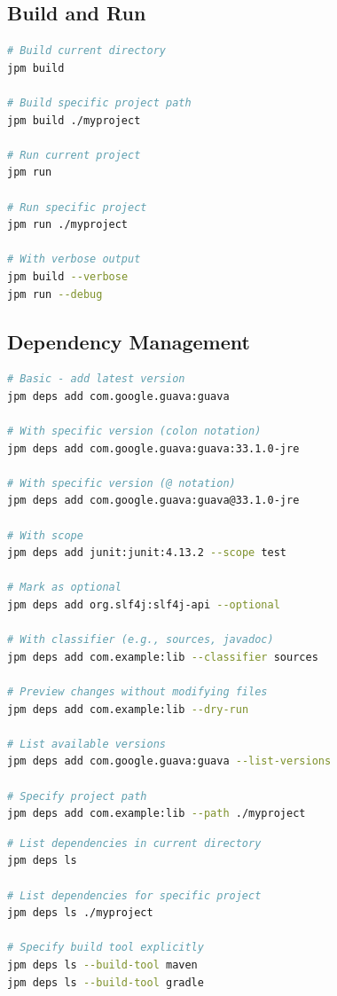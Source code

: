 \documentclass[12pt,a4paper]{report}
\begin{document}
\subsection{Build and Run}

\begin{lstlisting}[language=bash, caption=jpm build and jpm run]
# Build current directory
jpm build

# Build specific project path
jpm build ./myproject

# Run current project
jpm run

# Run specific project
jpm run ./myproject

# With verbose output
jpm build --verbose
jpm run --debug
\end{lstlisting}

\subsection{Dependency Management}

\begin{lstlisting}[language=bash, caption=jpm deps add - Add dependencies]
# Basic - add latest version
jpm deps add com.google.guava:guava

# With specific version (colon notation)
jpm deps add com.google.guava:guava:33.1.0-jre

# With specific version (@ notation)
jpm deps add com.google.guava:guava@33.1.0-jre

# With scope
jpm deps add junit:junit:4.13.2 --scope test

# Mark as optional
jpm deps add org.slf4j:slf4j-api --optional

# With classifier (e.g., sources, javadoc)
jpm deps add com.example:lib --classifier sources

# Preview changes without modifying files
jpm deps add com.example:lib --dry-run

# List available versions
jpm deps add com.google.guava:guava --list-versions

# Specify project path
jpm deps add com.example:lib --path ./myproject
\end{lstlisting}

\begin{lstlisting}[language=bash, caption=jpm deps ls - List dependencies]
# List dependencies in current directory
jpm deps ls

# List dependencies for specific project
jpm deps ls ./myproject

# Specify build tool explicitly
jpm deps ls --build-tool maven
jpm deps ls --build-tool gradle
\end{lstlisting}
\end{document}
